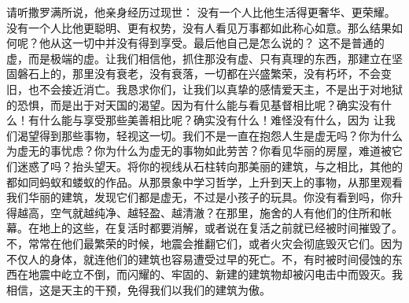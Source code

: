 请听撒罗满所说，他亲身经历过现世： 没有一个人比他生活得更奢华、更荣耀。没有一个人比他更聪明、更有权势，没有人看见万事都如此称心如意。那么结果如何呢？他从这一切中并没有得到享受。最后他自己是怎么说的？ 这不是普通的虚，而是极端的虚。让我们相信他，抓住那没有虚、只有真理的东西，那建立在坚固磐石上的，那里没有衰老，没有衰落，一切都在兴盛繁荣，没有朽坏，不会变旧，也不会接近消亡。我恳求你们，让我们以真挚的感情爱天主，不是出于对地狱的恐惧，而是出于对天国的渴望。因为有什么能与看见基督相比呢？确实没有什么！有什么能与享受那些美善相比呢？确实没有什么！难怪没有什么，因为 让我们渴望得到那些事物，轻视这一切。我们不是一直在抱怨人生是虚无吗？你为什么为虚无的事忧虑？你为什么为虚无的事物如此劳苦？你看见华丽的房屋，难道被它们迷惑了吗？抬头望天。将你的视线从石柱转向那美丽的建筑，与之相比，其他的都如同蚂蚁和蝼蚁的作品。从那景象中学习哲学，上升到天上的事物，从那里观看我们华丽的建筑，发现它们都是虚无，不过是小孩子的玩具。你没有看到吗，你升得越高，空气就越纯净、越轻盈、越清澈？在那里，施舍的人有他们的住所和帐幕。在地上的这些，在复活时都要消解，或者说在复活之前就已经被时间摧毁了。不，常常在他们最繁荣的时候，地震会推翻它们，或者火灾会彻底毁灭它们。因为不仅人的身体，就连他们的建筑也容易遭受过早的死亡。不，有时被时间侵蚀的东西在地震中屹立不倒，而闪耀的、牢固的、新建的建筑物却被闪电击中而毁灭。我相信，这是天主的干预，免得我们以我们的建筑为傲。\par

